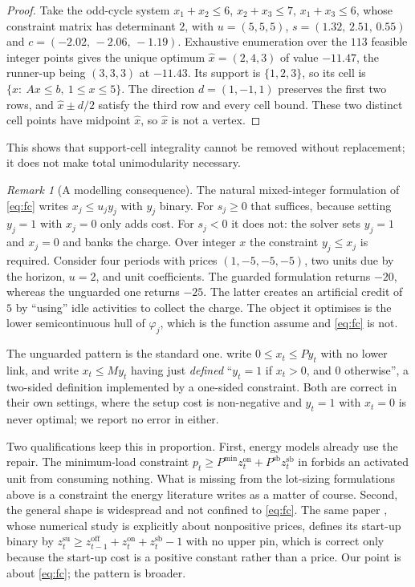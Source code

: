 \documentclass[3p,11pt]{elsarticle}
\theoremstyle{remark}
\newtheorem{remark}[theorem]{Remark}
\theoremstyle{definition}
\begin{document}
\begin{proof}
Take the odd-cycle system $x_1+x_2\le6$, $x_2+x_3\le7$, $x_1+x_3\le6$, whose constraint
matrix has determinant $2$, with $u=(5,5,5)$, $s=(1.32,\,2.51,\,0.55)$ and
$c=(-2.02,\,-2.06,\,-1.19)$. Exhaustive enumeration over the $113$ feasible integer
points gives the unique optimum $\hat x=(2,4,3)$ of value $-11.47$, the runner-up being
$(3,3,3)$ at $-11.43$. Its support is $\{1,2,3\}$, so its cell is
$\{x:\ Ax\le b,\ 1\le x\le5\}$. The direction $d=(1,-1,1)$ preserves the first two
rows, and $\hat x\pm d/2$ satisfy the third row and every cell bound. These two distinct
cell points have midpoint $\hat x$, so $\hat x$ is not a vertex.
\end{proof}

This shows that support-cell integrality cannot be removed without replacement; it does
not make total unimodularity necessary.

\begin{remark}[A modelling consequence]\label{rem:model}
The natural mixed-integer formulation of \eqref{eq:fc} writes $x_j\le u_jy_j$ with $y_j$
binary. For $s_j\ge0$ that suffices, because setting $y_j=1$ with $x_j=0$ only adds
cost. For $s_j<0$ it does not: the solver sets $y_j=1$ and $x_j=0$ and banks the charge.
Over integer $x$ the constraint $y_j\le x_j$ is required. Consider four periods with
prices $(1,-5,-5,-5)$, two units due by the horizon, $u=2$, and unit coefficients. The
guarded formulation returns $-20$, whereas the unguarded one returns $-25$. The latter
creates an artificial credit of $5$ by ``using'' idle activities to collect the charge.
The object it optimises is the lower
semicontinuous hull of $\varphi_j$, which is the function \cite{kya14} assume and
\eqref{eq:fc} is not.

The unguarded pattern is the standard one. \cite{apr15} write $0\le x_t\le Py_t$ with no
lower link, and \cite{lcw01} write $x_t\le My_t$ having just \emph{defined}
``$y_t=1$ if $x_t>0$, and $0$ otherwise'', a two-sided definition implemented by a
one-sided constraint. Both are correct in their own settings, where the setup cost is
non-negative and $y_t=1$ with $x_t=0$ is never optimal; we report no error in either.

Two qualifications keep this in proportion. First, energy models already use the repair.
The minimum-load constraint
$p_t\ge P^{\min}z^{\mathrm{on}}_t+P^{\mathrm{sb}}z^{\mathrm{sb}}_t$ in
\cite{raheli23} forbids an activated unit from consuming nothing. What is missing
from the lot-sizing formulations above is a constraint the energy literature writes as a
matter of course. Second, the general shape is widespread and not confined to
\eqref{eq:fc}. The same paper \cite{raheli23}, whose numerical study is explicitly about
nonpositive prices, defines its start-up binary by
$z^{\mathrm{su}}_t\ge z^{\mathrm{off}}_{t-1}+z^{\mathrm{on}}_t+z^{\mathrm{sb}}_t-1$ with no
upper pin, which is correct only because the start-up cost is a positive constant rather
than a price. Our point is about \eqref{eq:fc}; the pattern is broader.
\end{remark}
\end{document}
